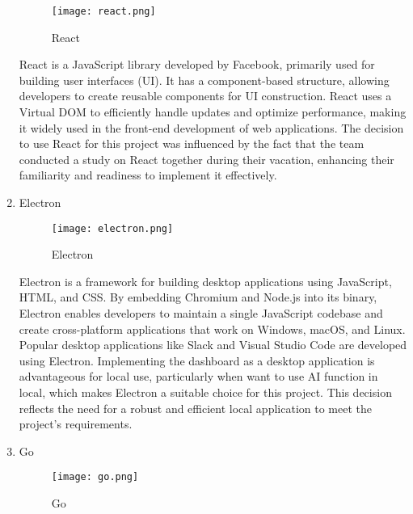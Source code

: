 \documentclass[conference]{IEEEtran}
\begin{document}
\begin{enumerate}[itemsep=2ex, parsep=1ex]
	      \begin{figure}[h!]
	      	\centering
	      	\texttt{[image: react.png]}
	      	\caption{React}
	      	\label{fig:React}
	      \end{figure}
	      	      
	      React is a JavaScript library developed by Facebook, primarily used for building
	      user interfaces (UI). It has a component-based structure, allowing developers
	      to create reusable components for UI construction. React uses a Virtual
	      DOM to efficiently handle updates and optimize performance, making it widely
	      used in the front-end development of web applications. The decision to use
	      React for this project was influenced by the fact that the team conducted
	      a study on React together during their vacation, enhancing their familiarity
	      and readiness to implement it effectively.
	      	      
	\item Electron
	      	      
	      \begin{figure}[h!]
	      	\centering
	      	\texttt{[image: electron.png]}
	      	\caption{Electron}
	      	\label{fig:Electron}
	      \end{figure}
	      	      
	      Electron is a framework for building desktop applications using JavaScript,
	      HTML, and CSS. By embedding Chromium and Node.js into its binary, Electron
	      enables developers to maintain a single JavaScript codebase and create
	      cross-platform applications that work on Windows, macOS, and Linux. Popular
	      desktop applications like Slack and Visual Studio Code are developed using
	      Electron. Implementing the dashboard as a desktop application is
	      advantageous for local use, particularly when want to use AI function in local,
	      which makes Electron a suitable choice for this project. This decision reflects
	      the need for a robust and efficient local application to meet the project’s
	      requirements.
	      
	      \vspace{5cm}
	      	      
	\item Go
	      	      
	      \begin{figure}[h!]
	      	\centering
	      	\texttt{[image: go.png]}
	      	\caption{Go}
	      	\label{fig:Go}
	      \end{figure}
	      	      

\end{enumerate}
\end{document}
